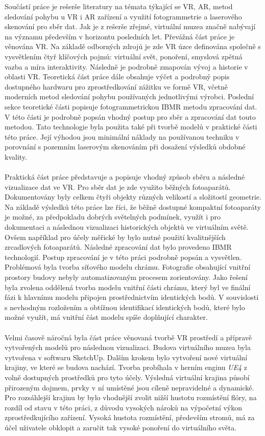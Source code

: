 \documentclass[a4paper, 12pt]{report}
\begin{document}
Součástí práce je rešerše literatury na témata týkající se VR, AR, metod sledování pohybu u VR i AR zařízení a využití fotogrammetrie a laserového skenování pro sběr dat. Jak je z rešerše zřejmé, virtuální muzea značně nabývají na významu především v horizontu posledních let. Převážná část práce je věnována VR. Na základě odborných zdrojů je zde VR úzce definována společně s vysvětlením čtyř klíčových pojmů: virtuální svět, ponoření, smyslová zpětná vazba a míra interaktivity. Následně je podrobně zmapován vývoj a historie v oblasti VR. Teoretická část práce dále obsahuje výčet a podrobný popis dostupného hardwaru pro zprostředkování zážitku ve formě VR, včetně moderních metod sledování pohybu používaných jednotlivými výrobci. Poslední sekce teoretické části popisuje fotogrammetrickou IBMR metodu zpracování dat. V této části je podrobně popsán vhodný postup pro sběr a zpracování dat touto metodou. Tato technologie byla použita také při tvorbě modelů v praktické části této práce. Její výhodou jsou minimální náklady na používanou techniku v porovnání s pozemním laserovým skenováním při dosažení výsledků obdobné kvality.\\
\\
Praktická část práce představuje a popisuje vhodný způsob sběru a následné vizualizace dat ve VR. Pro sběr dat je zde využito běžných fotoaparátů. Dokumentovány byly celkem čtyři objekty různých velikostí a složitostí geometrie. Na základě výsledků této práce lze říci, že běžně dostupné kompaktní fotoaparáty je možné, za předpokladu dobrých světelných podmínek, využít i pro dokumentaci a následnou vizualizaci historických objektů ve virtuálním světě. Ovšem například pro účely měřické by bylo nutné použití kvalitnějších zrcadlových fotoaparátů. Následné zpracování dat bylo provedeno IBMR technologií. Postup zpracování je v této práci podrobně popsán a vysvětlen. Problémová byla tvorba síťového modelu chrámu. Fotografie obsahující vnitřní prostory budovy nebyly automatizovaným procesem zorientovány. Jako řešení byla zvolena oddělená tvorba modelu vnitřní části chrámu, který byl ve finální fázi k hlavnímu modelu připojen prostřednictvím identických bodů. V souvislosti s nevhodným rozložením a obtížnou identifikací identických bodů, které bylo možné využít, má vnitřní část modelu spíše doplňující charakter. \\
\\
Velmi časově náročná byla část práce věnovaná tvorbě VR prostředí a přípravě vytvořených modelů pro následnou vizualizaci. Budova virtuálního muzea byla vytvořena v softwaru SketchUp. Dalším krokem bylo vytvoření nové virtuální krajiny, ve které se budova nachází. Tvorba probíhala v herním enginu \textit{UE4} z volně dostupných prostředků pro tyto účely. Výsledná virtuální krajina působí přirozeným dojmem, prvky v ní umístěné jsou cíleně nepravidelné a dynamické. Pro rozsáhlejší krajinu by bylo vhodnější zvolit nižší hustotu rozmístění flóry, na rozdíl od stavu v této práci, z důvodu vysokých nároků na výpočetní výkon zprostředkujícího zařízení. Vysoká hustota rozmístění, především stromů, má za účel uživatele obklopit a zaručit tak vysoké ponoření do virtuálního světa.\\
\end{document}
